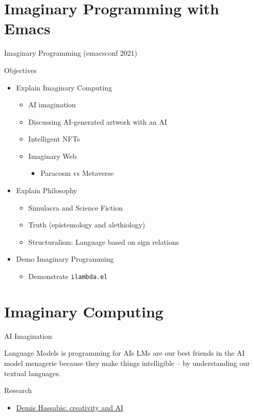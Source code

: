 \documentclass[presentation]{beamer}
\begin{document}
\section{Imaginary Programming with Emacs}
\label{sec:orgf736c6f}
\begin{frame}[label={sec:orgfcc5782},fragile]{Imaginary Programming (emacsconf 2021)}
 \begin{block}{Objectives}
\begin{itemize}
\item Explain Imaginary Computing
\begin{itemize}
\item AI imagination
\item Discussing AI-generated artwork with an AI
\item Intelligent NFTs
\item Imaginary Web
\begin{itemize}
\item Paracosm vs Metaverse
\end{itemize}
\end{itemize}
\item Explain Philosophy
\begin{itemize}
\item Simulacra and Science Fiction
\item Truth (epistemology and alethiology)
\item Structuralism: Language based on sign relations
\end{itemize}
\item Demo Imaginary Programming
\begin{itemize}
\item Demonstrate \texttt{ilambda.el}
\end{itemize}
\end{itemize}
\end{block}
\end{frame}

\section{Imaginary Computing}
\label{sec:orgec84551}
\begin{frame}[label={sec:org412a4aa}]{AI Imagination}
\begin{block}{Language Models is programming for AIs}
LMs are our best friends in the AI model
menagerie because they make things
intelligible -- by understanding our textual
languages.
\end{block}

\begin{block}{Research}
\begin{itemize}
\item \href{https://www.youtube.com/watch?v=d-bvsJWmqlc}{Demis Hassabis: creativity and AI}
\end{itemize}
\end{block}
\end{frame}
\end{document}
